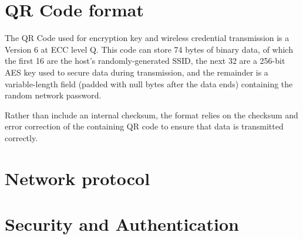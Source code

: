 \documentclass[12pt,notitlepage,letterpaper]{article}
\begin{document}
\begin{figure}[h]
\end{figure}

\section{QR Code format}
The QR Code used for encryption key and wireless credential transmission is a
Version 6 at ECC level Q. This code can store 74 bytes of binary data, of which
the first 16 are the host's randomly-generated SSID, the next 32 are a 256-bit
AES key used to secure data during transmission, and the remainder is a
variable-length field (padded with null bytes after the data ends) containing the
random network password.

Rather than include an internal checksum, the format relies on the checksum and
error correction of the containing QR code to ensure that data is transmitted
correctly.

\section{Network protocol}

\section{Security and Authentication}
\end{document}
